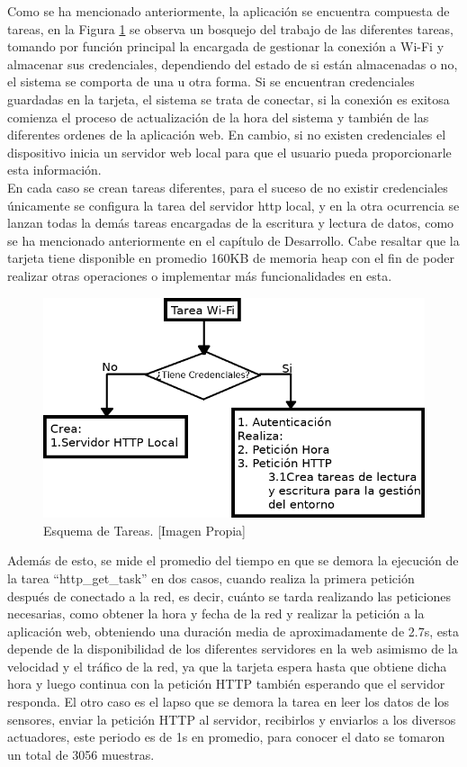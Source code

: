 Como se ha mencionado anteriormente, la aplicación se encuentra compuesta de tareas, en la Figura \ref{fig:tareas} se observa un bosquejo del trabajo de las diferentes tareas, tomando por función principal la encargada de gestionar la conexión a Wi-Fi y almacenar sus credenciales, dependiendo del estado de si están almacenadas o no, el sistema se comporta de una u otra forma. Si se encuentran credenciales guardadas en la tarjeta, el sistema se trata de conectar, si la conexión es exitosa comienza el proceso de actualización de la hora del sistema y también de las diferentes ordenes de la aplicación web. En cambio, si no existen credenciales el dispositivo inicia un servidor web local para que el usuario pueda proporcionarle esta información.\\

En cada caso se crean tareas diferentes, para el suceso de no existir credenciales únicamente se configura la tarea del servidor http local, y en la otra ocurrencia se lanzan todas la demás tareas encargadas de la escritura y lectura de datos, como se ha mencionado anteriormente en el capítulo de Desarrollo. Cabe resaltar que la tarjeta tiene disponible en promedio 160KB de memoria heap con el fin de poder realizar otras operaciones o implementar más funcionalidades en esta.\\

\begin{figure}[H]
	\centering
	\caption[Esquema de Tareas.]{Esquema de Tareas. [Imagen Propia]}
	\label{fig:tareas}
	\includegraphics[width=0.7\linewidth]{Imagenes/tareas}
\end{figure}

Además de esto, se mide el promedio del tiempo en que se demora la ejecución de la tarea ``http\_get\_task'' en dos casos, cuando realiza la primera petición después de conectado a la red, es decir, cuánto se tarda realizando las peticiones necesarias, como obtener la hora y fecha de la red y realizar la petición a la aplicación web, obteniendo una duración media de aproximadamente de 2.7s, esta depende de la disponibilidad de los diferentes servidores en la web asimismo de la velocidad y el tráfico de la red, ya que la tarjeta espera hasta que obtiene dicha hora y luego continua con la petición HTTP también esperando que el servidor responda. El otro caso es el lapso que se demora la tarea en leer los datos de los sensores, enviar la petición HTTP al servidor, recibirlos y enviarlos a los diversos actuadores, este periodo es de 1s en promedio, para conocer el dato se tomaron un total de 3056 muestras.

